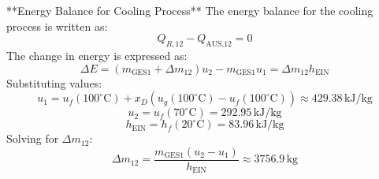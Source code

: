 **Energy Balance for Cooling Process**  
The energy balance for the cooling process is written as:  
\[
Q_{R,12} - Q_{\text{AUS,12}} = 0
\]  
The change in energy is expressed as:  
\[
\Delta E = \left( m_{\text{GES1}} + \Delta m_{12} \right) u_2 - m_{\text{GES1}} u_1 = \Delta m_{12} h_{\text{EIN}}
\]  
Substituting values:  
\[
u_1 = u_f(100^\circ\text{C}) + x_D \left( u_g(100^\circ\text{C}) - u_f(100^\circ\text{C}) \right) \approx 429.38 \, \text{kJ/kg}
\]  
\[
u_2 = u_f(70^\circ\text{C}) = 292.95 \, \text{kJ/kg}
\]  
\[
h_{\text{EIN}} = h_f(20^\circ\text{C}) = 83.96 \, \text{kJ/kg}
\]  
Solving for \( \Delta m_{12} \):  
\[
\Delta m_{12} = \frac{m_{\text{GES1}} \left( u_2 - u_1 \right)}{h_{\text{EIN}}} \approx 3756.9 \, \text{kg}
\]